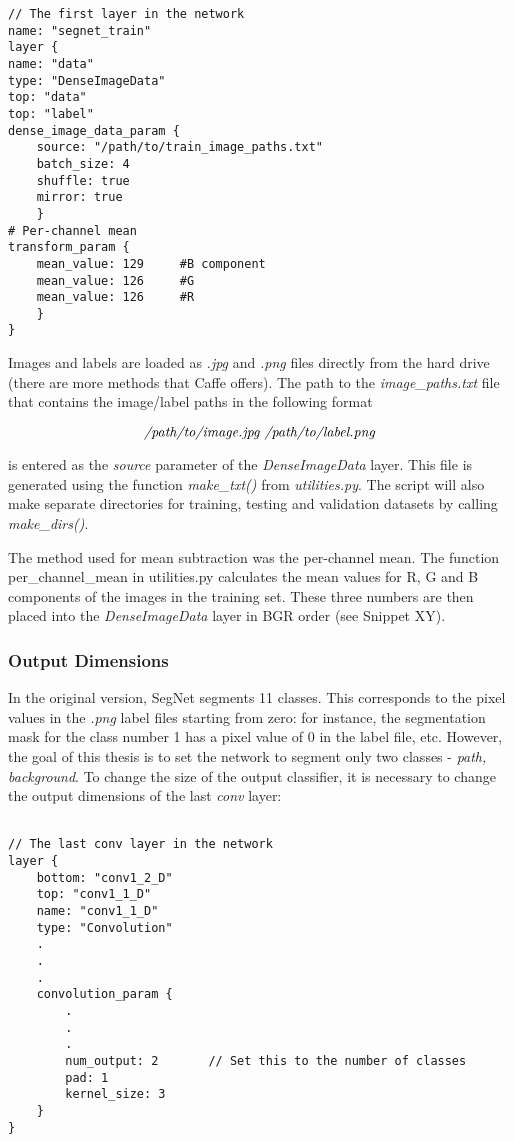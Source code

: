 \begin{lstlisting}
// The first layer in the network
name: "segnet_train"
layer {
name: "data"
type: "DenseImageData"
top: "data"
top: "label"
dense_image_data_param {
	source: "/path/to/train_image_paths.txt"
	batch_size: 4   			    			
	shuffle: true
	mirror: true	
	}
# Per-channel mean
transform_param {
	mean_value: 129		#B component
	mean_value: 126		#G
	mean_value: 126		#R
	}
}
\end{lstlisting} 

Images and labels are loaded as \textit{.jpg} and \textit{.png} files directly from the hard drive (there are more methods that Caffe offers). The path to the \textit{image\_paths.txt} file that contains the image/label paths in the following format

$$
\text{\textit{/path/to/image.jpg /path/to/label.png}}
$$

\noindent is entered as the \textit{source} parameter of the \textit{DenseImageData} layer. This file is generated using the function \textit{make\_txt()} from \textit{utilities.py}. The script will also make separate directories for training, testing and validation datasets by calling \textit{make\_dirs()}.

The method used for mean subtraction was the per-channel mean. The function per\_channel\_mean in utilities.py calculates the mean values for R, G and B components of the images in the training set. These three numbers are then placed into the \textit{DenseImageData} layer in BGR order (see Snippet XY).

\subsubsection{Output Dimensions}

In the original version, SegNet segments 11 classes. This corresponds to the pixel values in the \textit{.png} label files starting from zero: for instance, the segmentation mask for the class number 1 has a pixel value of 0 in the label file, etc. However, the goal of this thesis is to set the network to segment only two classes - \textit{path, background}. To change the size of the output classifier, it is necessary to change the output dimensions of the last \textit{conv} layer:

\begin{lstlisting}

// The last conv layer in the network
layer {
	bottom: "conv1_2_D"
	top: "conv1_1_D"
	name: "conv1_1_D"
	type: "Convolution"
	.
	.
	.
	convolution_param {
		.
		.
		.
		num_output: 2		// Set this to the number of classes
		pad: 1
		kernel_size: 3
	}
}
\end{lstlisting}

